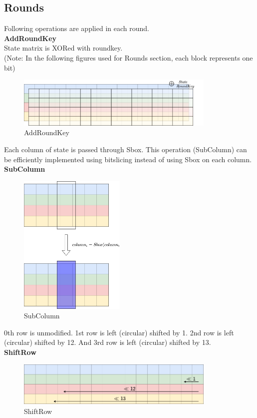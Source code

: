 \documentclass[final]{transcrypto}
\begin{document}
\subsection{Rounds}
\label{Rounds}
Following operations are applied in each round.\\
\textbf{AddRoundKey}\\
State matrix is XORed with roundkey.\\
(Note: In the following figures used for Rounds section, each block represents one bit)
\begin{figure}[H]
\caption{AddRoundKey}
\centering
\includegraphics[width=0.85\textwidth]{images/round_xor.png}
\end{figure}
Each column of state is passed through Sbox. This operation (SubColumn) can be efficiently implemented using bitslicing instead of using Sbox on each column.
\textbf{SubColumn}\\
\begin{figure}[H]
\caption{SubColumn}
\centering
\includegraphics[width=0.45\textwidth]{images/round_sbox.png}
\end{figure}
0th row is unmodified. 1st row is left (circular) shifted by 1. 2nd row is left (circular) shifted by 12. And 3rd row is left (circular) shifted by 13.\\
\textbf{ShiftRow}\\
\begin{figure}[H]
\caption{ShiftRow}
\centering
\includegraphics[width=0.85\textwidth]{images/round_shift.png}
\end{figure}
\end{document}
